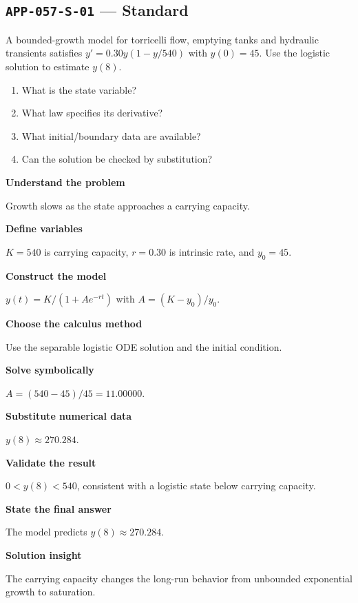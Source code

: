 \documentclass[11pt]{book}
\newcommand{\pid}[1]{\texttt{#1}}
\begin{document}
\subsection*{\pid{APP-057-S-01} — Standard}
\begin{problembox}
A bounded-growth model for torricelli flow, emptying tanks and hydraulic transients satisfies $y'=0.30y(1-y/540)$ with $y(0)=45$. Use the logistic solution to estimate $y(8)$.
\end{problembox}
\begin{promptbox}\begin{enumerate}
\item What is the state variable?
\item What law specifies its derivative?
\item What initial/boundary data are available?
\item Can the solution be checked by substitution?
\end{enumerate}\end{promptbox}
\begin{solutionbox}
\textbf{Understand the problem}\par Growth slows as the state approaches a carrying capacity.\par\medskip
\textbf{Define variables}\par $K=540$ is carrying capacity, $r=0.30$ is intrinsic rate, and $y_0=45$.\par\medskip
\textbf{Construct the model}\par $y(t)=K/(1+A e^{-rt})$ with $A=(K-y_0)/y_0$.\par\medskip
\textbf{Choose the calculus method}\par Use the separable logistic ODE solution and the initial condition.\par\medskip
\textbf{Solve symbolically}\par $A=(540-45)/45=11.00000$.\par\medskip
\textbf{Substitute numerical data}\par $y(8)\approx 270.284$.\par\medskip
\textbf{Validate the result}\par $0<y(8)<540$, consistent with a logistic state below carrying capacity.\par\medskip
\textbf{State the final answer}\par The model predicts $y(8)\approx 270.284$.\par\medskip
\textbf{Solution insight}\par The carrying capacity changes the long-run behavior from unbounded exponential growth to saturation.\par\medskip
\end{solutionbox}
\end{document}
